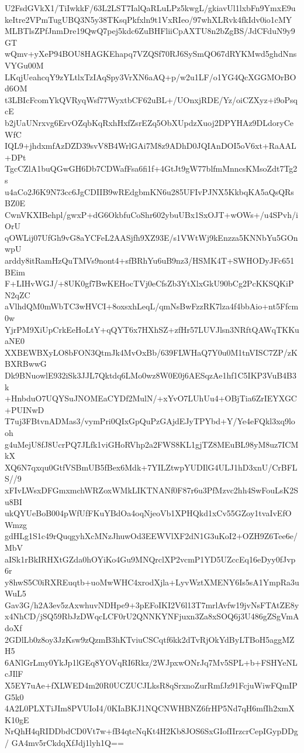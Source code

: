 U2FsdGVkX1/TiIwkkF/63L2LST7IalQaRLuLPz5kwgL/gkiavUl1lxbFn9YmxE9u
keItre2VPmTugUBQ3N5y38TKsqPkfxln9t1VxRIeo/97whXLRvk4fkIdv0io1cMY
MLBTlsZPfJnmDre19QwQ7pej5kdc6ZuBHFliiCpAXTU8n2bZgBS/JdCFduN9y9GT
wQmv+yXeP94BOU8HAGKEhapq7VZQSf70RJ6SySmQO67dRYKMwd5ghdNnsVYGu00M
LKqjUeahcqY9zYLtlxTzIAqSpy3VrXN6aAQ+p/w2u1LF/o1YG4QcXGGMOrBOd6OM
t3LBIcFcomYkQVRyqWsf77WyxtbCF62uBL+/UOnxjRDE/Yz/oiCZXyz+i9oPsqcE
b2jUaUNrxvg6ErvOZqbKqRxhHxfZsrEZq5ObXUpdzXuoj2DPYHAz9DLdoryCeWfC
IQL9+jhdxmfAzDZD39svV8B4WrlGAi7M8z9ADhD0JQIAnDOI5oV6xt+RaAAL+DPt
TgcCZlA1buQGwGH6Db7CDWafFsa6fi1f+4GtJt9gW77blfmMnncsKMsoZdt7Tg2s
u4aCo2J6K9N73cc6JgCDIIB9wREdgbmKN6u285UFIvPJNX5KkbqKA5aQsQRsBZ0E
CwnVKXIBehpl/gwxP+dG6OkbfuCoShr602ybuUBx1SxOJT+wOWs+/u4SPvh/iOrU
qOWLij07UfGh9vG8aYCFeL2AASjfh9XZ93E/s1VWtWj9kEnzza5KNNbYu5GOnwpU
arddy8itRamHzQuTMVs9nont4+sfBRhYu6uB9nz3/HSMK4T+SWHODyJFc651BEim
F+LIHvWGJ/+8UK0gf7BwKEHocTVj0eCfsZb3YtXlxGkU90bCg2PcKKSQKiPN2qZC
aVlhdQM0mWbTC3wHVCI+8oxsxhLeqL/qmNsBwFzzRK7lza4f4bbAio+nt5Ffcm0w
YjrPM9XiUpCrkEeHoLtY+qQYT6x7HXhSZ+zfHr57LUVJlsn3NRftQAWqTKKuaNE0
XXBEWBXyLO8bFON3QtmJk4MvOxBb/639FLWHaQ7Y0u0M1tnVISC7ZP/zKBXRBwwG
Dk9BNuowlE932iSk3JJL7Qktdq6LMo0wz8W0E0j6AESqzAe1hf1C5IKP3VuB4B3k
+HnbduO7UQYSuJNOMEaCYDf2MulN/+xYvO7LUhUu4+OBjTia6ZrIEYXGC+PUINwD
T7uj3FBtvnADMas3/vymPri0QIxGpQuPzGAjdEJyTPYbd+Y/Ye4eFQkl3xq9looh
g4uMejU8fJ8UcrPQ7JLfk1viGHoRVhp2a2FWS8KL1gjTZ8MEuBL98yM8uz7ICMkX
XQ6N7qxqu0GtfVSBmUB5fBex6Mdk+7YILZtwpYUDIlG4ULJ1hD3xnU/CrBFLS//9
xFIvLWsxDFGmxmchWRZoxWMkLIKTNANf0F87r6u3PfMzvc2hh4SwFouLsK2Su8BI
ukQYUeBoB004pWfUfFKuYBdOa4oqNjeoVb1XPHQkd1xCv55GZoy1tvaIvEfOWmzg
gdHLg1S1c49rQuqgyhXcMNzJhuwOd3EEWVlXF2dN1G3uKoI2+OZH9Z6Tee6e/MbV
aISk1rBkIRHXtGZda0hOYiKo4Gu9MNQrclXP2vcmP1YD5UZccEq16eDyy0fJvp6r
y8hwS5C0iRXREuqtb+uoMwWHC4xrodXjla+LyvWztXMENY6Is5sA1YmpRa3uWuL5
Gav3G/h2A3ev5zAxwhuvNDHpe9+3pEFoIKI2V6l13T7mrlAvfw19jvNsFTAtZE8y
x4NhCD/jSQ59RbJzDWqcLCF0rU2QNNKYNFjuxn3Za8xSOQ6j3U486gZSgVmAdoXf
2GDlLb0z8oy3JzKsw9zQzmB3hKTviuCSCqtf6kk2dTvRjOkYdByLTBoH5aggMZH5
6ANlGrLmy0YkJp1lGEq8YOVqRI6Rkz/2WJpxwONrJq7Mv5SPL+b+FSHYeNLcJIlF
X5EY7uAe+fXLWED4m20R0UCZUCJLksR8qSrxnoZurRmfJz91FcjuWiwFQmIPG5k0
4A2L0PLXTiJIm8PVUIoI4/0KIaBKJ1NQCNWHBNZ6frHP5Nd7qH6mfIh2xmXK10gE
NrQhH4qRIDDbdCD0Vt7w+fB4qtcNqKt4H2Kb8JOS6SxGIofIIrzcrCepIGypDDg/
GA4mv5rCkdqXfJdj1lyh1Q==
